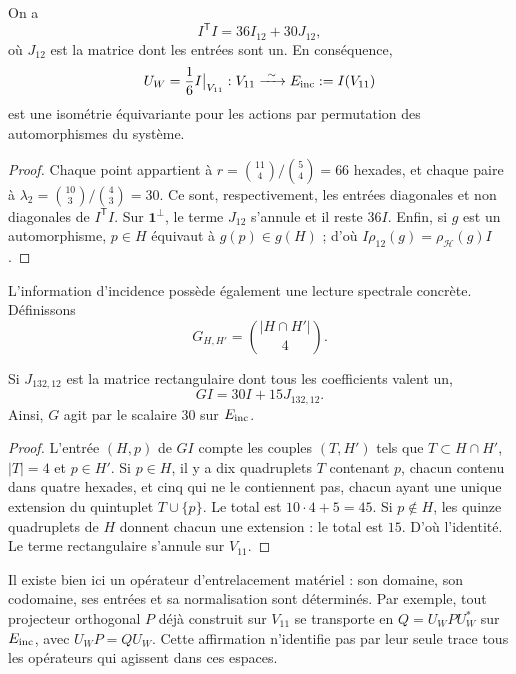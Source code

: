 \begin{proposition}
\label{exc:isometria}
On a
\[
 I^{\mathsf T}I=36I_{12}+30J_{12},
\]
où $J_{12}$ est la matrice dont les entrées sont un. En conséquence,
\[
 U_W=\frac16 I\big|_{V_{11}}:
 V_{11}\xrightarrow{\ \sim\ }E_{\rm inc}:=I(V_{11})
\]
est une isométrie équivariante pour les actions par permutation des
automorphismes du système.
\end{proposition}

\begin{proof}
Chaque point appartient à
$r=\binom{11}{4}/\binom54=66$ hexades, et chaque paire à
$\lambda_2=\binom{10}{3}/\binom43=30$. Ce sont, respectivement, les
entrées diagonales et non diagonales de $I^{\mathsf T}I$. Sur
$\mathbf1^\perp$, le terme $J_{12}$ s'annule et il reste $36I$.
Enfin, si $g$ est un automorphisme, $p\in H$ équivaut à
$g(p)\in g(H)$ ; d'où $I\rho_{12}(g)=\rho_{\mathcal H}(g)I$.
\end{proof}

L'information d'incidence possède également une lecture spectrale concrète. Définissons
\[
 G_{H,H'}=\binom{|H\cap H'|}{4}.
\]

\begin{lemma}
\label{exc:espectro}
Si $J_{132,12}$ est la matrice rectangulaire dont tous les coefficients valent un,
\[
 GI=30I+15J_{132,12}.
\]
Ainsi, $G$ agit par le scalaire $30$ sur $E_{\rm inc}$.
\end{lemma}

\begin{proof}
L'entrée $(H,p)$ de $GI$ compte les couples $(T,H')$ tels que
$T\subset H\cap H'$, $|T|=4$ et $p\in H'$. Si $p\in H$, il y a dix
quadruplets $T$ contenant $p$, chacun contenu dans quatre hexades,
et cinq qui ne le contiennent pas, chacun ayant une unique extension du
quintuplet $T\cup\{p\}$. Le total est $10\cdot4+5=45$.
Si $p\notin H$, les quinze quadruplets de $H$ donnent chacun une
extension : le total est $15$. D'où l'identité. Le terme rectangulaire
s'annule sur $V_{11}$.
\end{proof}

Il existe bien ici un opérateur d'entrelacement matériel : son domaine, son codomaine, ses entrées et sa normalisation sont déterminés. Par exemple, tout projecteur orthogonal $P$ déjà construit sur $V_{11}$ se transporte en $Q=U_WPU_W^*$ sur $E_{\rm inc}$, avec $U_WP=QU_W$. Cette affirmation n'identifie pas par leur seule trace tous les opérateurs qui agissent dans ces espaces.

